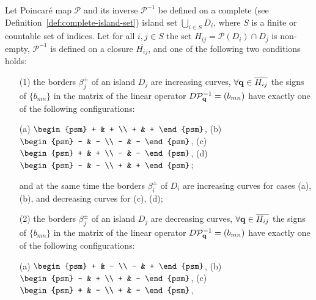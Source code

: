 \begin{theorem}
\label{thm:v-strips-mapping}
	Let Poincar\'e map $\mathcal{P}$ and its inverse $\mathcal{P}^{-1}$ be defined on a complete (see Definition~\ref{def:complete-island-set}) island set $\bigcup_{i \in S} D_i$, where $S$ is a finite or countable set of indices.
	Let for all $i, j \in S$ the set $H_{ij} = \mathcal{P} (D_i) \cap D_j$ is non-empty, $\mathcal{P}^{-1}$ is defined on a
	 closure $\overline{H_{ij}}$, and one of the following two conditions holds:
	\begin{enumerate}
		\item[(1)] the borders $\beta_j^{\pm}$ of an island $D_j$ are increasing curves, $\forall \vb{q} \in \overline{H_{ij}}$ the signs of $\{ b_{mn} \}$ in the matrix of the linear operator $D \mathcal{P}_{\vb{q}}^{-1} = (b_{mn})$ have exactly one of the following configurations:
			\begin{center}
				(a) $\begin{psm} + & + \\ + & + \end{psm}$, \quad
				(b) $\begin{psm} - & - \\ - & - \end{psm}$, \quad
				(c) $\begin{psm} + & + \\ - & - \end{psm}$, \quad
				(d) $\begin{psm} - & - \\ + & + \end{psm}$;
			\end{center}
			and at the same time the borders $\beta_i^{\pm}$ of $D_i$ are increasing curves for cases (a), (b), and decreasing curves for (c), (d);
		\item[(2)] the borders $\beta_j^{\pm}$ of an island $D_j$ are decreasing curves, $\forall \vb{q} \in \overline{H	_{ij}}$ the signs of $\{ b_{mn} \}$ in the matrix of the linear operator $D \mathcal{P}_{\vb{q}}^{-1} = (b_{mn})$ have exactly one of the following configurations:
			\begin{center}
				(a) $\begin{psm} + & - \\ - & + \end{psm}$, \quad
				(b) $\begin{psm} - & + \\ + & - \end{psm}$,	\quad
				(c) $\begin{psm} + & - \\ + & - \end{psm}$, \quad

\end{center}
\end{enumerate}
\end{theorem}
